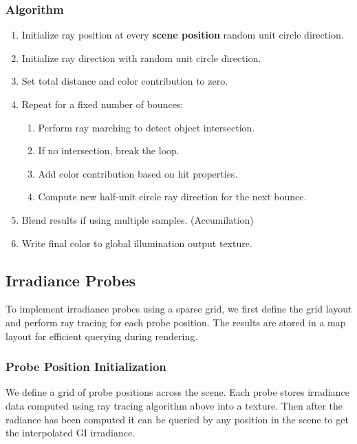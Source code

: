 \documentclass[acmtog, nonacm]{acmart}
\begin{document}
\subsubsection{Algorithm}
\begin{enumerate}
  \item Initialize ray position at every \textbf{scene position} random unit circle direction.
  \item Initialize ray direction with random unit circle direction.
  \item Set total distance and color contribution to zero.
  \item Repeat for a fixed number of bounces:
  \begin{enumerate}
    \item Perform ray marching to detect object intersection.
    \item If no intersection, break the loop.
    \item Add color contribution based on hit properties.
    \item Compute new half-unit circle ray direction for the next bounce.
  \end{enumerate}
  \item Blend results if using multiple samples. (Accumilation)
  \item Write final color to global illumination output texture.
\end{enumerate}

\subsection{Irradiance Probes}
To implement irradiance probes using a sparse grid, we first define the grid layout and perform ray tracing for each probe position. The results are stored in a map layout for efficient querying during rendering.

\subsubsection{Probe Position Initialization}
We define a grid of probe positions across the scene. Each probe stores irradiance data computed using ray tracing algorithm above into a texture. Then after the radiance has been computed it can be queried by any position in the scene to get the interpolated GI irradiance.
\end{document}
